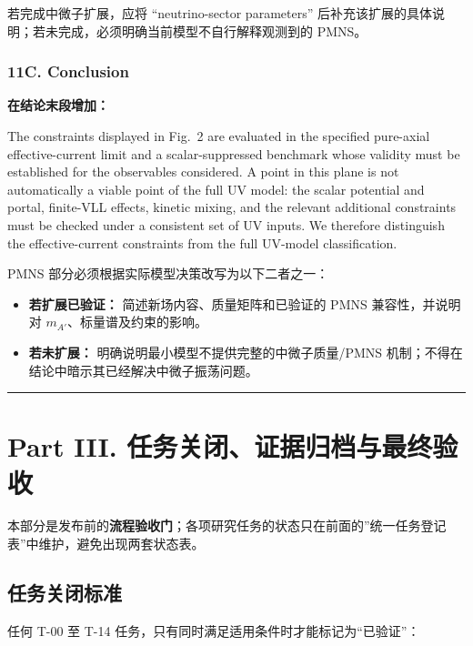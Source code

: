 \documentclass[
]{article}
\providecommand{\tightlist}{%
  \setlength{\itemsep}{0pt}\setlength{\parskip}{0pt}}
\begin{document}
若完成中微子扩展，应将 ``neutrino-sector parameters''
后补充该扩展的具体说明；若未完成，必须明确当前模型不自行解释观测到的
PMNS。

\subsubsection{11C. Conclusion}\label{c.-conclusion}

\textbf{在结论末段增加：}

The constraints displayed in Fig.~2 are evaluated in the specified
pure-axial effective-current limit and a scalar-suppressed benchmark
whose validity must be established for the observables considered. A
point in this plane is not automatically a viable point of the full
UV model: the scalar potential and portal, finite-VLL effects,
kinetic mixing, and the relevant additional constraints must be
checked under a consistent set of UV inputs. We therefore distinguish
the effective-current constraints from the full UV-model classification.

PMNS 部分必须根据实际模型决策改写为以下二者之一：

\begin{itemize}
\tightlist
\item
  \textbf{若扩展已验证：} 简述新场内容、质量矩阵和已验证的 PMNS
  兼容性，并说明对 \(m_{A'}\)、标量谱及约束的影响。
\item
  \textbf{若未扩展：} 明确说明最小模型不提供完整的中微子质量/PMNS
  机制；不得在结论中暗示其已经解决中微子振荡问题。
\end{itemize}

\begin{center}\rule{0.5\linewidth}{0.5pt}\end{center}

\section{Part III.
任务关闭、证据归档与最终验收}\label{part-iii.-ux4efbux52a1ux5173ux95edux8bc1ux636eux5f52ux6863ux4e0eux6700ux7ec8ux9a8cux6536}

本部分是发布前的\textbf{流程验收门}；各项研究任务的状态只在前面的''统一任务登记表''中维护，避免出现两套状态表。

\subsection{任务关闭标准}\label{ux4efbux52a1ux5173ux95edux6807ux51c6}

任何 T-00 至 T-14 任务，只有同时满足适用条件时才能标记为``已验证''：
\end{document}
